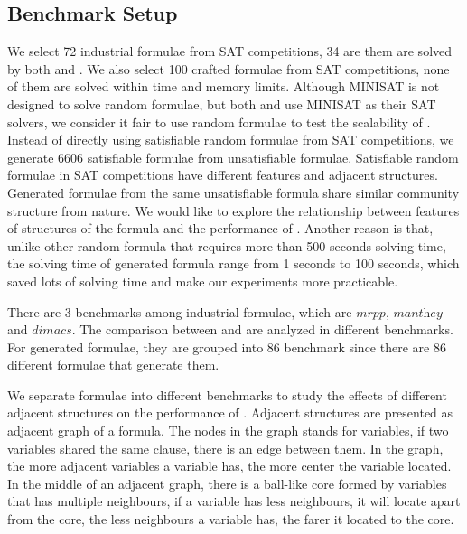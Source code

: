 \subsection{Benchmark Setup}
We select 72 industrial formulae from SAT competitions, 34 are them are solved by both \tool and \minibones. We also select 100 crafted formulae from SAT competitions, none of them are solved within time and memory limits. Although MINISAT is not designed to solve random formulae, but both \tool and \minibones use MINISAT as their SAT solvers, we consider it fair to use random formulae to test the scalability of \tool. Instead of directly using satisfiable random formulae from SAT competitions, we generate 6606 satisfiable formulae from unsatisfiable formulae. Satisfiable random formulae in SAT competitions have different features and adjacent structures. Generated formulae from the same unsatisfiable formula share similar community structure from nature. We would like to explore the relationship between features of structures of the formula and the performance of \tool. Another reason is that, unlike other random formula that requires more than 500 seconds solving time, the solving time of generated formula range from 1 seconds to 100 seconds, which saved lots of solving time and make our experiments more practicable.

There are 3 benchmarks among industrial formulae, which are $\textit{mrpp}$, $\textit{manthey}$ and $\textit{dimacs}$. The comparison between \tool and \minibones are analyzed in different benchmarks.
For generated formulae, they are grouped into 86 benchmark since there are 86 different formulae that generate them.

We separate formulae into different benchmarks to study the effects of different adjacent structures on the performance of \tool. Adjacent structures are presented as adjacent graph of a formula. The nodes in the graph stands for variables, if two variables shared the same clause, there is an edge between them. In the graph, the more adjacent variables a variable has, the more center the variable located. In the middle of an adjacent graph, there is a ball-like core formed by variables that has multiple neighbours, if a variable has less neighbours, it will locate apart from the core, the less neighbours a variable has, the farer it located to the core.

